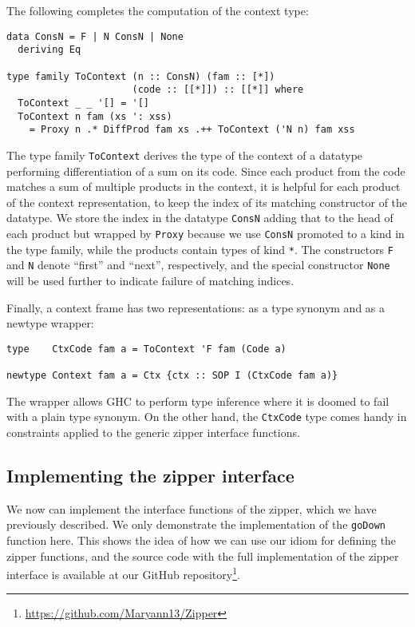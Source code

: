 \documentclass[runningheads]{llncs}
\newcommand{\K}[1]{\lstinline{#1}}
\begin{document}
The following completes the computation of the context type:
\begin{lstlisting}
data ConsN = F | N ConsN | None
  deriving Eq

type family ToContext (n :: ConsN) (fam :: [*])
                      (code :: [[*]]) :: [[*]] where
  ToContext _ _ '[] = '[]
  ToContext n fam (xs ': xss)
    = Proxy n .* DiffProd fam xs .++ ToContext ('N n) fam xss
\end{lstlisting}
The type family \K{ToContext} derives the type of the context of a datatype performing differentiation of a sum on its code. Since each product from the code matches a sum of multiple products in the context, it is helpful for each product of the context representation, to keep the index of its matching constructor of the datatype. We store the index in the datatype \K{ConsN} adding that to the head of each product but wrapped by \K{Proxy} because we use \K{ConsN} promoted to a kind in the type family, while the products contain types of kind \K{*}. The constructors \K{F} and \K{N} denote ``first'' and ``next'', respectively, and the special constructor \K{None} will be used further to indicate failure of matching indices.

Finally, a context frame has two representations: as a type synonym and as a newtype wrapper:
\begin{lstlisting}
type    CtxCode fam a = ToContext 'F fam (Code a)

newtype Context fam a = Ctx {ctx :: SOP I (CtxCode fam a)}
\end{lstlisting}
The wrapper allows GHC to perform type inference where it is doomed to fail with a plain type synonym. On the other hand, the \K{CtxCode} type comes handy in constraints applied to the generic zipper interface functions.

\subsection{Implementing the zipper interface}
\label{ss:zip-impl}

We now can implement the interface functions of the zipper, which we have previously described. We only demonstrate the implementation of the \K{goDown} function here. This shows the idea of how we can use our idiom for defining the zipper functions, and the source code with the full implementation of the zipper interface is available at our \textsf{GitHub} repository\footnote{\url{https://github.com/Maryann13/Zipper}}.
\end{document}
